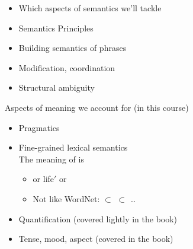 \documentclass[a4paper,landscape,headrule,footrule]{foils}
\begin{document}
\begin{itemize}
\item Which aspects of semantics we’ll tackle
\item Semantics Principles
\item Building semantics of phrases
\item Modification, coordination
\item Structural ambiguity
\end{itemize}



Aspects of meaning we  account for (in this course)
\begin{itemize}
\item Pragmatics
\item Fine-grained lexical semantics
  \\ The meaning of  is
  \begin{itemize}\addtolength{\itemsep}{2ex}
  \item {}  
or 
\textsf{life}$'$
or
\item Not like WordNet: 
  $\subset$  $\subset$  \ldots

 \end{itemize}
\item Quantification \hfill (covered lightly in the book)
\item Tense, mood, aspect \hfill (covered in the book)
 \end{itemize}


\end{document}
